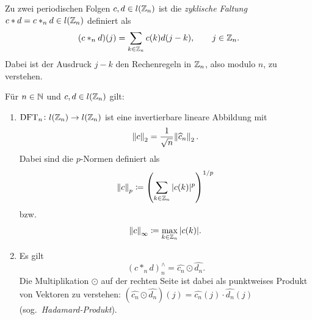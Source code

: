 \begin{definition}
Zu zwei periodischen Folgen $ c, d \in l(\mathbb{Z}_{n}) $ ist die \emph{zyklische Faltung}
$ c * d = c *_{n} d \in l(\mathbb{Z}_{n}) $ definiert als
\[
  (c *_{n} d)(j) = \sum_{k \in \mathbb{Z}_{n}} c(k) d(j - k), \qquad j \in \mathbb{Z}_{n}.
\]
Dabei ist der Ausdruck $ j - k $ den Rechenregeln in $ \mathbb{Z}_{n} $, also modulo $ n $, zu verstehen.
\end{definition}

\begin{proposition}
Für $ n \in \mathbb{N} $ und $ c, d \in l(\mathbb{Z}_{n}) $ gilt:
\begin{enumerate}
\item $ \operatorname{DFT}_{n} \colon l(\mathbb{Z}_{n}) \rightarrow l(\mathbb{Z}_{n}) $ ist eine invertierbare lineare Abbildung
  mit
  \[
    \norm{c}_{2} = \frac{1}{\sqrt{n}} \norm{\widehat{c}_{n}}_{2}.
  \]
  Dabei sind die $ p $-Normen definiert als
  \[
    \norm{c}_{p} \coloneqq \left( \sum_{k \in \mathbb{Z}_{n}} |c(k)|^{p} \right)^{1/p}
  \]
  bzw.
  \[
    \norm{c}_{\infty} \coloneqq \max_{k \in \mathbb{Z}_{n}} |c(k)|.
  \]
\item Es gilt
  \[
    (c *_{n} d)_{n}^{\wedge} = \widehat{c_{n}} \odot \widehat{d_{n}}.
  \]
  Die Multiplikation $ \odot $ auf der rechten Seite ist dabei als punktweises Produkt von Vektoren 
  zu verstehen: 
  $ \left( \widehat{c_{n}} \odot \widehat{d_{n}} \right)(j) = 
    \widehat{c_{n}}(j) \cdot \widehat{d_{n}}(j) $ (sog.\ \emph{Hadamard-Produkt}).
\end{enumerate}
\end{proposition}

